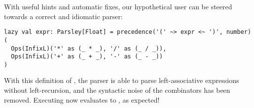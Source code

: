 \documentclass[../../main.tex]{subfiles}
\begin{document}
With useful hints and automatic fixes, our hypothetical user can be steered towards a correct and idiomatic parser:
\begin{verbatim}
lazy val expr: Parsley[Float] = precedence('(' ~> expr <~ ')', number)(
  Ops(InfixL)('*' as (_ * _), '/' as (_ / _)),
  Ops(InfixL)('+' as (_ + _), '-' as (_ - _))
)
\end{verbatim}
%
With this definition of , the parser is able to parse left-associative expressions without left-recursion, and the syntactic noise of the  combinators has been removed.
Executing  now evaluates to , as expected!

\end{document}
